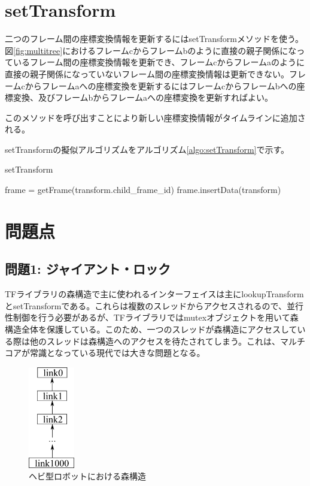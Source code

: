 \documentclass[a4paper]{jreport}	%
\begin{document}
\section{setTransform}
二つのフレーム間の座標変換情報を更新するにはsetTransformメソッドを使う。図\ref{fig:multitree}におけるフレームcからフレームbのように直接の親子関係になっているフレーム間の座標変換情報を更新でき、フレームcからフレームaのように直接の親子関係になっていないフレーム間の座標変換情報は更新できない。フレームcからフレームaへの座標変換を更新するにはフレームcからフレームbへの座標変換、及びフレームbからフレームaへの座標変換を更新すればよい。

このメソッドを呼び出すことにより新しい座標変換情報がタイムラインに追加される。

setTransformの擬似アルゴリズムをアルゴリズム\ref{algo:setTransform}で示す。


\begin{algorithm}
\caption{setTransform}\label{algo:setTransform}
\begin{algorithmic}[1]
	 
	\State frame = getFrame(transform.child\_frame\_id)
	\State frame.insertData(transform)
	\EndFunction
\end{algorithmic}
\end{algorithm}

\section{問題点}
\subsection*{問題1: ジャイアント・ロック}
TFライブラリの森構造で主に使われるインターフェイスは主にlookupTransformとsetTransformである。これらは複数のスレッドからアクセスされるので、並行性制御を行う必要があるが、TFライブラリではmutexオブジェクトを用いて森構造全体を保護している。このため、一つのスレッドが森構造にアクセスしている際は他のスレッドは森構造へのアクセスを待たされてしまう。これは、マルチコアが常識となっている現代では大きな問題となる。

\begin{figure}[h] 
\centering
\includegraphics[width=2cm]{snake}	
\caption{ヘビ型ロボットにおける森構造}
\label{fig:snake}
\end{figure}
\end{document}
